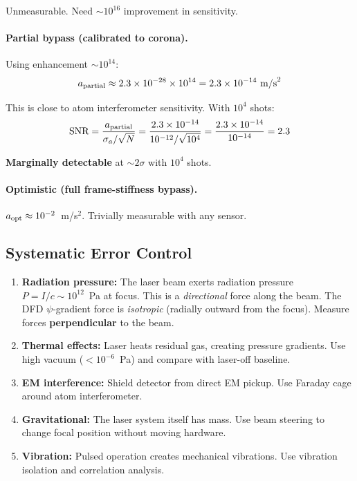\documentclass[12pt,a4paper]{article}
\begin{document}
Unmeasurable. Need $\sim 10^{16}$ improvement in sensitivity.

\paragraph{Partial bypass (calibrated to corona).}
Using enhancement $\sim 10^{14}$:
\begin{equation}
a_{\rm partial} \approx 2.3 \times 10^{-28} \times 10^{14}
= 2.3 \times 10^{-14}~\text{m/s}^2
\end{equation}

This is close to atom interferometer sensitivity.  With $10^4$ shots:
\begin{equation}
\text{SNR} = \frac{a_{\rm partial}}{\sigma_a / \sqrt{N}}
= \frac{2.3 \times 10^{-14}}{10^{-12}/\sqrt{10^4}}
= \frac{2.3 \times 10^{-14}}{10^{-14}}
= 2.3
\end{equation}

\textbf{Marginally detectable} at $\sim 2\sigma$ with $10^4$ shots.

\paragraph{Optimistic (full frame-stiffness bypass).}
$a_{\rm opt} \approx 10^{-2}$~m/s$^2$. Trivially measurable with any sensor.

\subsection{Systematic Error Control}

\begin{enumerate}
\item \textbf{Radiation pressure:} The laser beam exerts radiation pressure
  $P = I/c \sim 10^{12}$~Pa at focus.  This is a \emph{directional} force along
  the beam.  The DFD $\psi$-gradient force is \emph{isotropic} (radially outward
  from the focus).  Measure forces \textbf{perpendicular} to the beam.

\item \textbf{Thermal effects:} Laser heats residual gas, creating pressure
  gradients.  Use high vacuum ($<10^{-6}$~Pa) and compare with laser-off baseline.

\item \textbf{EM interference:} Shield detector from direct EM pickup.
  Use Faraday cage around atom interferometer.

\item \textbf{Gravitational:} The laser system itself has mass.  Use beam
  steering to change focal position without moving hardware.

\item \textbf{Vibration:} Pulsed operation creates mechanical vibrations.
  Use vibration isolation and correlation analysis.
\end{enumerate}
\end{document}
